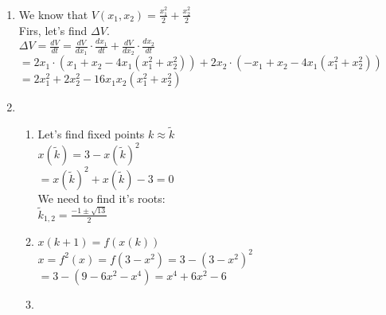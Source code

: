 \documentclass[12pt,a4paper, margin=1in]{article}
\begin{document}
\begin{enumerate}
        
    \item %
        We know that $V(x_1, x_2) = \frac{x_1^2}{2} + \frac{x_2^2}{2}$\\
        Firs, let's find $\Delta V$.\\
        $\Delta V =  \frac{dV}{dt} = \frac{dV}{dx_1}\cdot\frac{dx_1}{dt} + \frac{dV}{dx_2}\cdot\frac{dx_2}{dt}$\\
        $=2x_1\cdot(x_1+x_2-4x_1(x_1^2+x_2^2)) + 2x_2\cdot(-x_1+x_2-4x_1(x_1^2+x_2^2))$\\
        $=2x_1^2 + 2x_2^2 - 16x_1x_2(x_1^2+x_2^2)$\\
        
        
        
    \item %
        \begin{enumerate}
            \item 
            Let's find fixed points $k \approx \tilde{k}$\\
            $x(\tilde{k}) = 3 - x(\tilde{k})^2$\\
            $ = x(\tilde{k})^2 + x(\tilde{k}) - 3 = 0$\\
            We need to find it's roots:\\
            $\tilde{k}_{1,2}=\frac{-1\pm\sqrt{13}}{2}$
            
            \item 
            $x(k+1) = f(x(k))$\\
            $x = f^2(x) = f(3-x^2) = 3 - (3-x^2)^2$\\
            $= 3 - (9 - 6x^2 - x^4) = x^4 + 6x^2 - 6$
            
            
            \item 
        \end{enumerate}


\end{enumerate}
\end{document}
